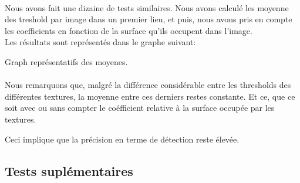
\paragraph*{}
Nous avons fait une dizaine de tests similaires. Nous avons calculé les moyenne des treshold par image dans un premier lieu, et puis, nous avons pris en compte les coefficients en fonction de la surface qu'ils occupent dans l'image. \\

Les résultats sont représentés dans le graphe suivant:

Graph représentatifs des moyenes.

\paragraph*{}
Nous remarquons que, malgré la différence considérable entre les thresholds des différentes textures, la moyenne entre ces derniers restes constante. Et ce, que ce soit avec ou sans compter le coéfficient relative à la surface occupée par les textures. 

Ceci implique que la précision en terme de détection reste élevée.


\subsection{Tests suplémentaires}

